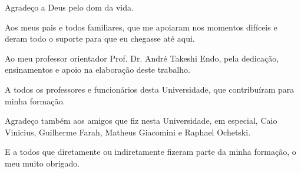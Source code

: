 
\begin{agradecimentos}[AGRADECIMENTOS] 

Agradeço a Deus pelo dom da vida.

Aos meus pais e todos familiares, que me apoiaram nos momentos difíceis e deram todo o suporte para que eu chegasse até aqui.

Ao meu professor orientador Prof. Dr. André Takeshi Endo, pela dedicação, ensinamentos e apoio na elaboração deste trabalho.

A todos os professores e funcionários desta Universidade, que contribuíram para minha formação.

Agradeço também aos amigos que fiz nesta Universidade, em especial, Caio Vinicius, Guilherme Farah, Matheus Giacomini e Raphael Ochetski.

E a todos que diretamente ou indiretamente fizeram parte da minha formação, o meu muito obrigado.

\end{agradecimentos}
